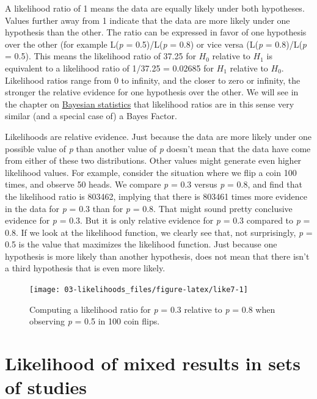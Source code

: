 \documentclass[
  oneside]{krantz}
\begin{document}
A likelihood ratio of 1 means the data are equally likely under both hypotheses. Values further away from 1 indicate that the data are more likely under one hypothesis than the other. The ratio can be expressed in favor of one hypothesis over the other (for example L(\emph{p} = 0.5)/L(\emph{p} = 0.8) or vice versa (L(\emph{p} = 0.8)/L(\emph{p} = 0.5). This means the likelihood ratio of 37.25 for \(H_0\) relative to \(H_1\) is equivalent to a likelihood ratio of 1/37.25 = 0.02685 for \(H_1\) relative to \(H_0\). Likelihood ratios range from 0 to infinity, and the closer to zero or infinity, the stronger the relative evidence for one hypothesis over the other. We will see in the chapter on \protect\hyperlink{bayes}{Bayesian statistics} that likelihood ratios are in this sense very similar (and a special case of) a Bayes Factor.

Likelihoods are relative evidence. Just because the data are more likely under one possible value of \emph{p} than another value of \emph{p} doesn't mean that the data have come from either of these two distributions. Other values might generate even higher likelihood values. For example, consider the situation where we flip a coin 100 times, and observe 50 heads. We compare \emph{p} = 0.3 versus \emph{p} = 0.8, and find that the likelihood ratio is 803462, implying that there is 803461 times more evidence in the data for \emph{p} = 0.3 than for \emph{p} = 0.8. That might sound pretty conclusive evidence for \emph{p} = 0.3. But it is only relative evidence for \emph{p} = 0.3 compared to \emph{p} = 0.8. If we look at the likelihood function, we clearly see that, not surprisingly, \emph{p} = 0.5 is the value that maximizes the likelihood function. Just because one hypothesis is more likely than another hypothesis, does not mean that there isn't a third hypothesis that is even more likely.



\begin{figure}

{\centering \texttt{[image: 03-likelihoods\_files/figure-latex/like7-1]} 

}

\caption{Computing a likelihood ratio for \emph{p} = 0.3 relative to \emph{p} = 0.8 when observing \emph{p} = 0.5 in 100 coin flips.}\label{fig:like7}
\end{figure}

\hypertarget{likelihood-of-mixed-results-in-sets-of-studies}{%
\section{Likelihood of mixed results in sets of studies}\label{likelihood-of-mixed-results-in-sets-of-studies}}
\end{document}
